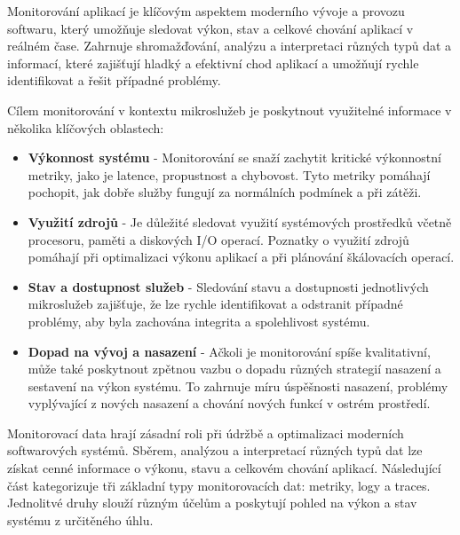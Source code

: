 


Monitorování aplikací je klíčovým aspektem moderního vývoje a provozu softwaru, který umožňuje sledovat výkon, stav a celkové chování aplikací v reálném čase. Zahrnuje shromažďování, analýzu a interpretaci různých typů dat a informací, které zajišťují hladký a efektivní chod aplikací a umožňují rychle identifikovat a řešit případné problémy. \cite{Majors2022}


Cílem monitorování v kontextu mikroslužeb je poskytnout využitelné informace v několika klíčových oblastech:

\begin {itemize}
    \item \textbf{Výkonnost systému} - Monitorování se snaží zachytit kritické výkonnostní metriky, jako je latence, propustnost a chybovost. Tyto metriky pomáhají pochopit, jak dobře služby fungují za normálních podmínek a při zátěži.
    \item \textbf{Využití zdrojů} - Je důležité sledovat využití systémových prostředků včetně procesoru, paměti a diskových I/O operací. Poznatky o využití zdrojů pomáhají při optimalizaci výkonu aplikací a při plánování škálovacích operací.
    \item \textbf{Stav a dostupnost služeb} - Sledování stavu a dostupnosti jednotlivých mikroslužeb zajišťuje, že lze rychle identifikovat a odstranit případné problémy, aby byla zachována integrita a spolehlivost systému.
    \item \textbf{Dopad na vývoj a nasazení} - Ačkoli je monitorování spíše kvalitativní, může také poskytnout zpětnou vazbu o dopadu různých strategií nasazení a sestavení na výkon systému. To zahrnuje míru úspěšnosti nasazení, problémy vyplývající z nových nasazení a chování nových funkcí v ostrém prostředí.
\end{itemize}


Monitorovací data hrají zásadní roli při údržbě a optimalizaci moderních softwarových systémů. Sběrem, analýzou a interpretací různých typů dat lze získat cenné informace o výkonu, stavu a celkovém chování aplikací. Následující část kategorizuje tři základní typy monitorovacích dat: metriky, logy a traces. Jednolitvé druhy slouží různým účelům a poskytují pohled na výkon a stav systému z určitěného úhlu. \cite{Blanco2023}

